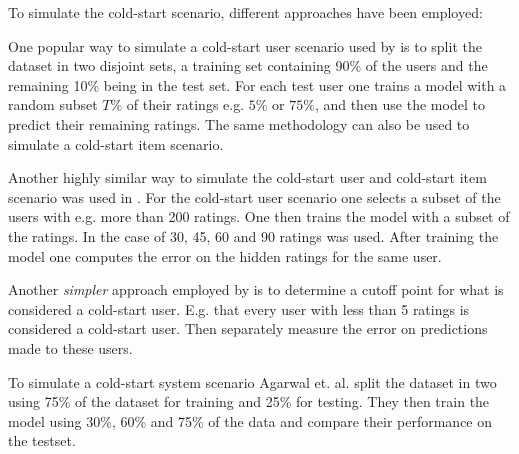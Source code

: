 To simulate the cold-start scenario, different approaches have been employed:

One popular way to simulate a cold-start user scenario used by \cite{Stern2009, Lam2008} is to split the dataset in two disjoint sets, a training set containing 90\% of the users and the remaining 10\% being in the test set. For each test user one trains a model with a random subset $T\%$ of their ratings e.g. $5\%$ or $75\%$, and then use the model to predict their remaining ratings. The same methodology can also be used to simulate a cold-start item scenario.

Another highly similar way to simulate the cold-start user and cold-start item scenario was used in \cite{Rashid2002, Rashid2008}. For the cold-start user scenario one selects a subset of the users with e.g. more than 200 ratings. One then trains the model with a subset of the ratings. In the case of \cite{Rashid2002} 30, 45, 60 and 90 ratings was used. After training the model one computes the error on the hidden ratings for the same user.

Another \emph{simpler} approach employed by \cite{Massa2007, Jamali2009} is to determine a cutoff point for what is considered a cold-start user. E.g. that every user with less than 5 ratings is considered a cold-start user. Then separately measure the error on predictions made to these users.

To simulate a cold-start system scenario Agarwal et. al. \cite{2009} split the dataset in two using 75\% of the dataset for training and 25\% for testing. They then train the model using 30\%, 60\% and 75\% of the data and compare their performance on the testset.




